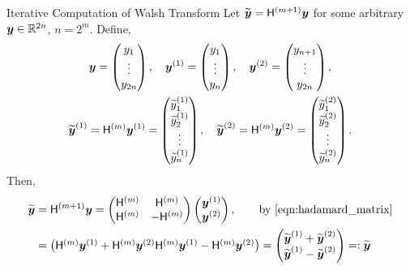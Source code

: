 \documentclass[handout, 10pt,compress,xcolor={usenames,dvipsnames}]{beamer} %
\begin{document}
\begin{frame}{Iterative Computation of Walsh Transform}
	\vspace{-4ex}
	Let $\widetilde{\boldsymbol{y}} = \mathsf{H}^{(m+1)} {\boldsymbol{y}}$ for some arbitrary $\boldsymbol{y} \in \mathbb{R}^{2n}$, $n = 2^m$. Define, 
	\begin{gather*}
	\boldsymbol{y} = \begin{pmatrix} y_1 \\ \vdots \\ y_{2n} \end{pmatrix}, \quad 
	\boldsymbol{y}^{(1)} = \begin{pmatrix} y_1 \\ \vdots \\ y_{n} \end{pmatrix}, \quad 
	\boldsymbol{y}^{(2)}  = \begin{pmatrix} y_{n+1} \\ \vdots \\ y_{2n} \end{pmatrix}, \\ 
	\widetilde{\boldsymbol{y}}^{(1)} = \mathsf{H}^{(m)} \boldsymbol{y}^{(1)} = 
	\begin{pmatrix} \widetilde{y}^{(1)}_1 \\ \widetilde{y}^{(1)}_2 \\ \vdots \\ \widetilde{y}^{(1)}_{n} \end{pmatrix}, \quad 
	\widetilde{\boldsymbol{y}}^{(2)}  =  \mathsf{H}^{(m)} \boldsymbol{y}^{(2)} =
	\begin{pmatrix} \widetilde{y}^{(2)}_{1} \\  \widetilde{y}^{(2)}_{2} \\ \vdots \\ \widetilde{y}^{(2)}_{n} \end{pmatrix}. 
	\end{gather*}
	Then,
	\begin{align*}
	\widetilde{\boldsymbol{y}} &= \mathsf{H}^{({m+1})} {\boldsymbol{y}} 
	= \begin{pmatrix}
	\mathsf{H}^{(m)} & \mathsf{H}^{(m)} \\ \mathsf{H}^{(m)} & - \mathsf{H}^{(m)}
	\end{pmatrix} 
	\begin{pmatrix}
	\boldsymbol{y}^{(1)} \\ \boldsymbol{y}^{(2)}
	\end{pmatrix}, \qquad \text{by \eqref{eqn:hadamard_matrix}} \\
	&= 
	\begin{pmatrix}
	\mathsf{H}^{(m)} \boldsymbol{y}^{(1)} + \mathsf{H}^{(m)} \boldsymbol{y}^{(2)} 
	\mathsf{H}^{(m)} \boldsymbol{y}^{(1)} - \mathsf{H}^{(m)} \boldsymbol{y}^{(2)}
	\end{pmatrix}
	= 
	\begin{pmatrix}
	\widetilde{\boldsymbol{y}}^{(1)} + \widetilde {\boldsymbol{y}}^{(2)} \\ 
	\widetilde {\boldsymbol{y}}^{(1)} - \widetilde {\boldsymbol{y}}^{(2)}
	\end{pmatrix} =: \widetilde{\boldsymbol{y}} 
	\end{align*}
\end{frame}
\end{document}
